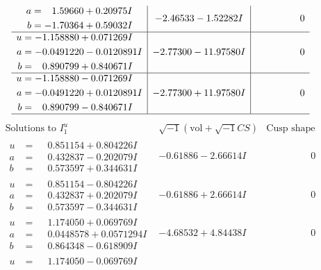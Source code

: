\documentclass[1p]{elsarticle_modified}
\theoremstyle{definition}
\newcommand{\I}{\sqrt{-1}}
\begin{document}
$$\begin{array}{c|c|c}
\begin{aligned}
a &= \phantom{-}1.59660 + 0.20975 I \\
b &= -1.70364 + 0.59032 I\end{aligned}
 & -2.46533 - 1.52282 I & \phantom{-0.000000 } 0 \\ \hline\begin{aligned}
u &= -1.158880 + 0.071269 I \\
a &= -0.0491220 - 0.0120891 I \\
b &= \phantom{-}0.890799 + 0.840671 I\end{aligned}
 & -2.77300 - 11.97580 I & \phantom{-0.000000 } 0 \\ \hline\begin{aligned}
u &= -1.158880 - 0.071269 I \\
a &= -0.0491220 + 0.0120891 I \\
b &= \phantom{-}0.890799 - 0.840671 I\end{aligned}
 & -2.77300 + 11.97580 I & \phantom{-0.000000 } 0\\
 \hline 
 \end{array}$$\newpage$$\begin{array}{c|c|c}  
\text{Solutions to }I^u_{1}& \I (\text{vol} + \sqrt{-1}CS) & \text{Cusp shape}\\
 \hline 
\begin{aligned}
u &= \phantom{-}0.851154 + 0.804226 I \\
a &= \phantom{-}0.432837 - 0.202079 I \\
b &= \phantom{-}0.573597 + 0.344631 I\end{aligned}
 & -0.61886 - 2.66614 I & \phantom{-0.000000 } 0 \\ \hline\begin{aligned}
u &= \phantom{-}0.851154 - 0.804226 I \\
a &= \phantom{-}0.432837 + 0.202079 I \\
b &= \phantom{-}0.573597 - 0.344631 I\end{aligned}
 & -0.61886 + 2.66614 I & \phantom{-0.000000 } 0 \\ \hline\begin{aligned}
u &= \phantom{-}1.174050 + 0.069769 I \\
a &= \phantom{-}0.0448578 + 0.0571294 I \\
b &= \phantom{-}0.864348 - 0.618909 I\end{aligned}
 & -4.68532 + 4.84438 I & \phantom{-0.000000 } 0 \\ \hline\begin{aligned}
u &= \phantom{-}1.174050 - 0.069769 I \\

\end{aligned}
\end{array}$$
\end{document}
